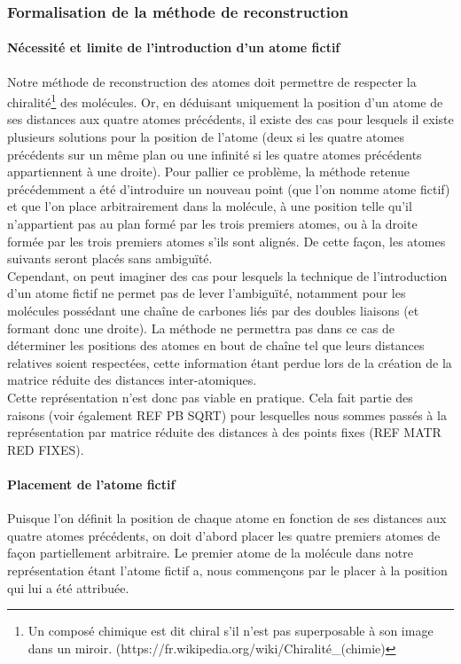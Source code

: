 \subsubsection{Formalisation de la méthode de reconstruction}

\paragraph{Nécessité et limite de l'introduction d'un atome fictif} Notre méthode de reconstruction des atomes doit permettre de respecter la chiralité\footnote{Un composé chimique est dit chiral s'il n'est pas superposable à son image dans un miroir. (https://fr.wikipedia.org/wiki/Chiralité\_(chimie)} des molécules. Or, en déduisant uniquement la position d'un atome de ses distances aux quatre atomes précédents, il existe des cas pour lesquels il existe plusieurs solutions pour la position de l'atome (deux si les quatre atomes précédents sur un même plan ou une infinité si les quatre atomes précédents appartiennent à une droite). Pour pallier ce problème, la méthode retenue précédemment a été d'introduire un nouveau point (que l'on nomme atome fictif) et que l'on place arbitrairement dans la molécule, à une position telle qu'il n'appartient pas au plan formé par les trois premiers atomes, ou à la droite formée par les trois premiers atomes s'ils sont alignés. De cette façon, les atomes suivants seront placés sans ambiguïté.\\
Cependant, on peut imaginer des cas pour lesquels la technique de l'introduction d'un atome fictif ne permet pas de lever l'ambiguïté, notamment pour les molécules possédant une chaîne de carbones liés par des doubles liaisons (et formant donc une droite). La méthode ne permettra pas dans ce cas de déterminer les positions des atomes en bout de chaîne tel que leurs distances relatives soient respectées, cette information étant perdue lors de la création de la matrice réduite des distances inter-atomiques. \\
Cette représentation n'est donc pas viable en pratique. Cela fait partie des raisons (voir également REF PB SQRT) pour lesquelles nous sommes passés à la représentation par matrice réduite des distances à des points fixes (REF MATR RED FIXES).

\paragraph{Placement de l'atome fictif} Puisque l'on définit la position de chaque atome en fonction de ses distances aux quatre atomes précédents, on doit d'abord placer les quatre premiers atomes de façon partiellement arbitraire. Le premier atome de la molécule dans notre représentation étant l'atome fictif a, nous commençons par le placer à la position qui lui a été attribuée.

